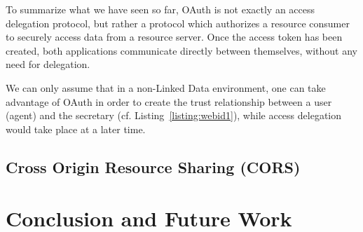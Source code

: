 \documentclass[a4paper]{llncs}
\begin{document}
To summarize what we have seen so far, OAuth is not exactly an access delegation protocol, but rather a protocol which authorizes a resource consumer to securely access data from a resource server. Once the access token has been created, both applications communicate directly between themselves, without any need for delegation.

We can only assume that in a non-Linked Data environment, one can take advantage of OAuth in order to create the trust relationship between a user (agent) and the secretary (cf. Listing~\ref{listing:webid1}), while access delegation would take place at a later time.



\subsection{Cross Origin Resource Sharing (CORS)}

\section{Conclusion and Future Work}\label{sec:conclusion}




\end{document}
